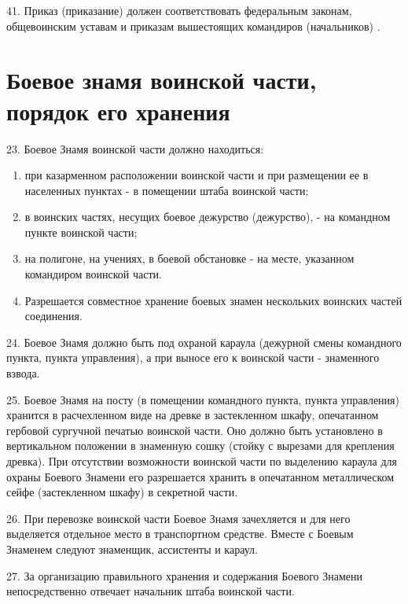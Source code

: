 \documentclass[12pt,a4paper]{report}
\begin{document}
41. Приказ (приказание) должен соответствовать федеральным законам, общевоинским уставам и приказам вышестоящих командиров (начальников) . 

\section{Боевое знамя воинской части, порядок его хранения}

23. Боевое Знамя воинской части должно находиться:
\begin{enumerate}
\item при казарменном расположении воинской части и при размещении ее в населенных пунктах - в помещении штаба воинской части;

\item в воинских частях, несущих боевое дежурство (дежурство), - на командном пункте воинской части;

\item на полигоне, на учениях, в боевой обстановке - на месте, указанном командиром воинской части.

\item Разрешается совместное хранение боевых знамен нескольких воинских частей соединения.
\end{enumerate}
24. Боевое Знамя должно быть под охраной караула (дежурной смены командного пункта, пункта управления), а при выносе его к воинской части - знаменного взвода.

25. Боевое Знамя на посту (в помещении командного пункта, пункта управления) хранится в расчехленном виде на древке в застекленном шкафу, опечатанном гербовой сургучной печатью воинской части. Оно должно быть установлено в вертикальном положении в знаменную сошку (стойку с вырезами для крепления древка). При отсутствии возможности воинской части по выделению караула для охраны Боевого Знамени его разрешается хранить в опечатанном металлическом сейфе (застекленном шкафу) в секретной части.

26. При перевозке воинской части Боевое Знамя зачехляется и для него выделяется отдельное место в транспортном средстве. Вместе с Боевым Знаменем следуют знаменщик, ассистенты и караул.

27. За организацию правильного хранения и содержания Боевого Знамени непосредственно отвечает начальник штаба воинской части.
\end{document}
